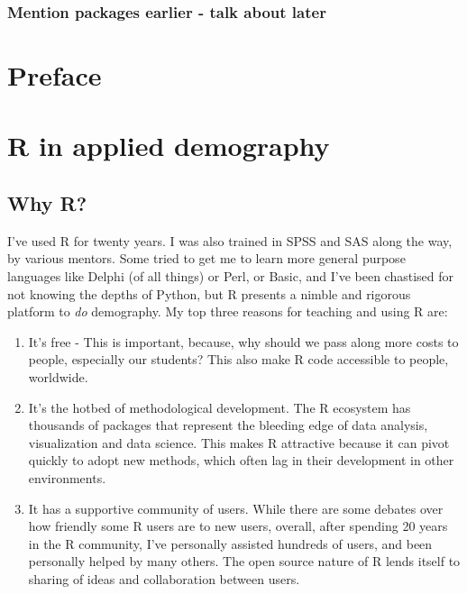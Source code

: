 \documentclass[
  letterpaper,
  DIV=11,
  numbers=noendperiod]{scrreprt}
\begin{document}
\hypertarget{mention-packages-earlier---talk-about-later}{%
\subsection*{Mention packages earlier - talk about
later}\label{mention-packages-earlier---talk-about-later}}


\hypertarget{preface-1}{%
\chapter{Preface}\label{preface-1}}


\hypertarget{r-in-applied-demography}{%
\chapter{R in applied demography}\label{r-in-applied-demography}}

\hypertarget{why-r}{%
\section{Why R?}\label{why-r}}

I've used R for twenty years. I was also trained in SPSS and SAS along
the way, by various mentors. Some tried to get me to learn more general
purpose languages like Delphi (of all things) or Perl, or Basic, and
I've been chastised for not knowing the depths of Python, but R presents
a nimble and rigorous platform to \emph{do} demography. My top three
reasons for teaching and using R are:

\begin{enumerate}
\def\labelenumi{\arabic{enumi}.}
\item
  It's free - This is important, because, why should we pass along more
  costs to people, especially our students? This also make R code
  accessible to people, worldwide.
\item
  It's the hotbed of methodological development. The R ecosystem has
  thousands of packages that represent the bleeding edge of data
  analysis, visualization and data science. This makes R attractive
  because it can pivot quickly to adopt new methods, which often lag in
  their development in other environments.
\item
  It has a supportive community of users. While there are some debates
  over how friendly some R users are to new users, overall, after
  spending 20 years in the R community, I've personally assisted
  hundreds of users, and been personally helped by many others. The open
  source nature of R lends itself to sharing of ideas and collaboration
  between users.
\end{enumerate}
\end{document}
